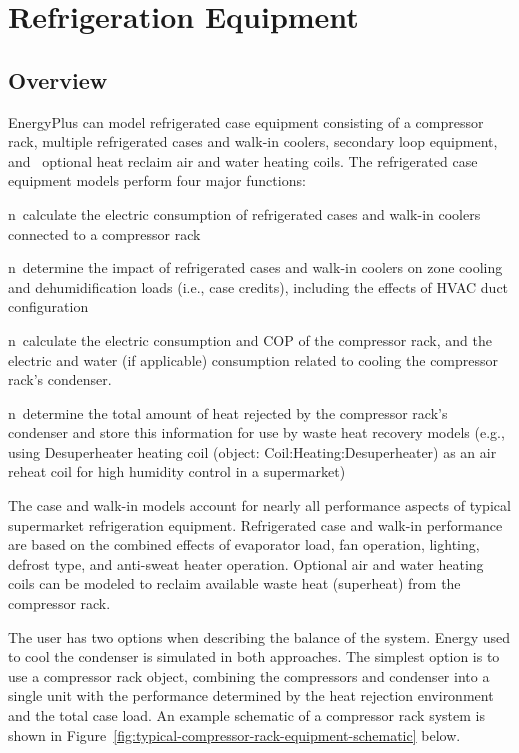 \section{Refrigeration Equipment }\label{refrigeration-equipment}

\subsection{Overview}\label{overview-023}

EnergyPlus can model refrigerated case equipment consisting of a compressor rack, multiple refrigerated cases and walk-in coolers, secondary loop equipment, and~ optional heat reclaim air and water heating coils. The refrigerated case equipment models perform four major functions:

n~calculate the electric consumption of refrigerated cases and walk-in coolers connected to a compressor rack

n~determine the impact of refrigerated cases and walk-in coolers on zone cooling and dehumidification loads (i.e., case credits), including the effects of HVAC duct configuration

n~calculate the electric consumption and COP of the compressor rack, and the electric and water (if applicable) consumption related to cooling the compressor rack's condenser.

n~determine the total amount of heat rejected by the compressor rack's condenser and store this information for use by waste heat recovery models (e.g., using Desuperheater heating coil (object: Coil:Heating:Desuperheater) as an air reheat coil for high humidity control in a supermarket)

The case and walk-in models account for nearly all performance aspects of typical supermarket refrigeration equipment. Refrigerated case and walk-in performance are based on the combined effects of evaporator load, fan operation, lighting, defrost type, and anti-sweat heater operation. Optional air and water heating coils can be modeled to reclaim available waste heat (superheat) from the compressor rack.

The user has two options when describing the balance of the system. Energy used to cool the condenser is simulated in both approaches. The simplest option is to use a compressor rack object, combining the compressors and condenser into a single unit with the performance determined by the heat rejection environment and the total case load. An example schematic of a compressor rack system is shown in Figure~\ref{fig:typical-compressor-rack-equipment-schematic} below.

